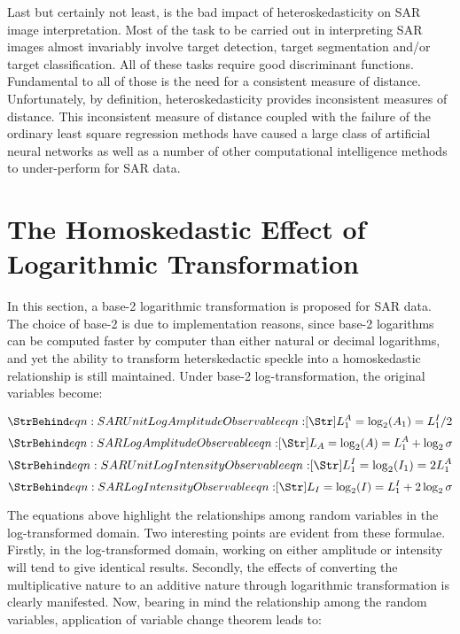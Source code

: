 Last but certainly not least, is the bad impact of heteroskedasticity on SAR image interpretation. 
Most of the task to be carried out in interpreting SAR images almost invariably involve target detection, target segmentation and/or target classification. 
All of these tasks require good discriminant functions. 
Fundamental to all of those is the need for a consistent measure of distance. 
Unfortunately, by definition, heteroskedasticity provides inconsistent measures of distance. 
This inconsistent measure of distance coupled with the failure of the ordinary least square regression methods have caused a large class of artificial neural networks as well as a number of other computational intelligence methods to under-perform for SAR data.


\section{The Homoskedastic Effect of Logarithmic Transformation}
\label{sec:homoskedastic_sar}

In this section, a base-2 logarithmic transformation is proposed for SAR data. 
The choice of base-2 is due to implementation reasons,
  since base-2 logarithms can be computed faster by computer than either natural or decimal logarithms,
  and yet the ability to transform heterskedactic speckle into a homoskedastic relationship is still maintained.
Under base-2 log-transformation, the original variables become:

\begin{equation}
  \label{eqn:SAR Unit Log Amplitude Observable}
  \caption{eqn:SAR Unit Log Amplitude Observable}
L_{1}^{A} = \log_2(A_1) = L_{1}^{I} / 2 
\end{equation}
\begin{equation}
  \label{eqn:SAR Log Amplitude Observable}
  \caption{eqn:SAR Log Amplitude Observable}
L_A = \log_2(A) 	= L_{1}^{A} + \log_2\sigma 
\end{equation}
\begin{equation}
  \label{eqn:SAR Unit Log Intensity Observable}
  \caption{eqn:SAR Unit Log Intensity Observable}
L_{1}^{I} = \log_2(I_1) = 2 L_{1}^{A} 
\end{equation}
\begin{equation}
  \label{eqn:SAR Log Intensity Observable}
  \caption{eqn:SAR Log Intensity Observable}
L_I = \log_2(I) 	= L_{1}^{I} + 2 \log_2\sigma
\end{equation}

The equations above highlight the relationships among random variables in the log-transformed domain. 
Two interesting points are evident from these formulae. 
Firstly, in the log-transformed domain, working on either amplitude or intensity will tend to give identical results. 
Secondly, the effects of converting the multiplicative nature to an additive nature through logarithmic transformation
is clearly manifested.
Now, bearing in mind the relationship among the random variables, %
application of variable change theorem leads to: 


